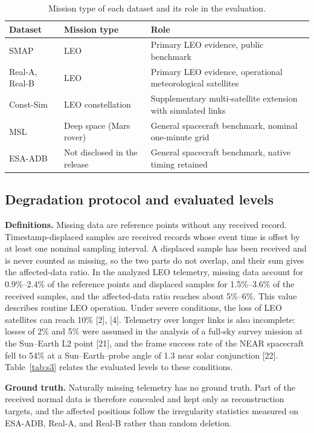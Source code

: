 \documentclass[10pt,a4paper]{article}
\begin{document}
\begin{table}[!htbp]
\centering
\caption{Mission type of each dataset and its role in the evaluation.}
\label{tab:s1}
\small
\begin{tabularx}{0.88\linewidth}{l l X}
\toprule
Dataset & Mission type & Role \\
\midrule
SMAP & LEO & Primary LEO evidence, public benchmark \\
Real-A, Real-B & LEO & Primary LEO evidence, operational meteorological satellites \\
Const-Sim & LEO constellation & Supplementary multi-satellite extension with simulated links \\
MSL & Deep space (Mars rover) & General spacecraft benchmark, nominal one-minute grid \\
ESA-ADB & Not disclosed in the release & General spacecraft benchmark, native timing retained \\
\bottomrule
\end{tabularx}
\end{table}

\subsection{Degradation protocol and evaluated levels}

\textbf{Definitions.} Missing data are reference points without any received record. Timestamp-displaced samples are received records whose event time is offset by at least one nominal sampling interval. A displaced sample has been received and is never counted as missing, so the two parts do not overlap, and their sum gives the affected-data ratio. In the analyzed LEO telemetry, missing data account for 0.9\%--2.4\% of the reference points and displaced samples for 1.5\%--3.6\% of the received samples, and the affected-data ratio reaches about 5\%--6\%. This value describes routine LEO operation. Under severe conditions, the loss of LEO satellites can reach 10\% [2], [4]. Telemetry over longer links is also incomplete: losses of 2\% and 5\% were assumed in the analysis of a full-sky survey mission at the Sun--Earth L2 point [21], and the frame success rate of the NEAR spacecraft fell to 54\% at a Sun--Earth--probe angle of 1.3\textdegree{} near solar conjunction [22]. Table~\ref{tab:s3} relates the evaluated levels to these conditions.

\textbf{Ground truth.} Naturally missing telemetry has no ground truth. Part of the received normal data is therefore concealed and kept only as reconstruction targets, and the affected positions follow the irregularity statistics measured on ESA-ADB, Real-A, and Real-B rather than random deletion.
\end{document}
